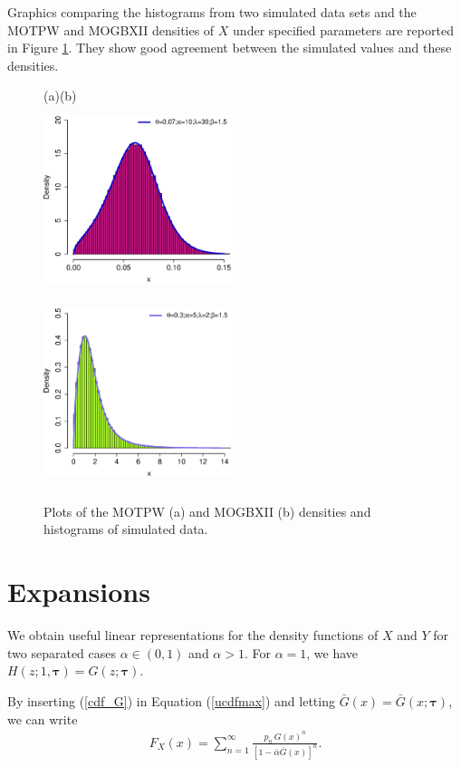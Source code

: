 \documentclass[12pt]{article}
\begin{document}
Graphics comparing the histograms from two simulated data sets and the MOTPW and MOGBXII densities of $X$
under specified parameters are reported in Figure \ref{hist_MOTPW_MOGBXII}. They show good agreement between the simulated values
and these densities.
\begin{figure}[!htb]\small
	\begin{center}
		(a)\hspace{5cm}(b)\\					
		\includegraphics[width=5.5cm,height=5.5cm]{histograma_MOTPW.eps}~
		\includegraphics[width=5.5cm,height=5.5cm]{histograma_MOGBXII.eps}
		\caption{Plots of the MOTPW (a) and MOGBXII (b) densities and histograms of simulated data.}
		\label{hist_MOTPW_MOGBXII}
	\end{center}
\end{figure}




\section{Expansions}\label{expansions}

We obtain useful linear representations for the density functions of $X$ and $Y$ for two separated cases $\alpha\in(0,1)$
and $\alpha >1$. For $\alpha=1$, we have $H(z;1,\bm{\tau})=G(z;\bm{\tau})$.

By inserting (\ref{cdf_G}) in Equation (\ref{ucdfmax}) and letting $\bar{G}(x)=\bar{G}(x;\bm{\tau})$, we can write
\begin{eqnarray}\label{auxiliar}
F_X(x)=\sum_{n=1}^{\infty}\frac{p_n\,G(x)^n}{\left[1-\bar{\alpha}\bar{G}(x)\right]^n}.
\end{eqnarray}
\end{document}
